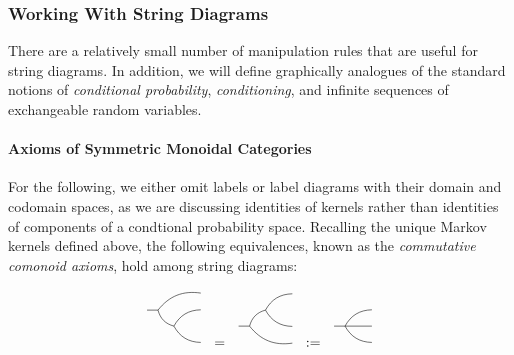 \subsubsection{Working With String Diagrams}\label{sssec:string_diagram_manipulation}


There are a relatively small number of manipulation rules that are useful for string diagrams. In addition, we will define graphically analogues of the standard notions of \emph{conditional probability}, \emph{conditioning}, and infinite sequences of exchangeable random variables.

\paragraph{Axioms of Symmetric Monoidal Categories}

For the following, we either omit labels or label diagrams with their domain and codomain spaces, as we are discussing identities of kernels rather than identities of components of a condtional probability space. Recalling the unique Markov kernels defined above, the following equivalences, known as the \emph{commutative comonoid axioms}, hold among string diagrams:

\begin{align}
	\begin{tikzpicture}[scale=0.8]
	\path (0,0) node (X) {} 
	++ (0.5,0) coordinate (copy0)
	+ (1.5,0.5) node (X1) {}
	++ (0.5,-0.5) coordinate (copy1)
	+(1,0.5) node (X2) {}
	+(1,-0.5) node (X3) {};
	\draw (X) -- (copy0) to [bend left] (X1) (copy0) to [bend right] (copy1) to [bend left] (X2) (copy1) to [bend right] (X3);
	\end{tikzpicture}
	=
	\begin{tikzpicture}[scale=0.8]
	\path (0,0) node (X) {} 
	++ (0.5,0) coordinate (copy0)
	+ (1.5,-0.5) node (X1) {}
	++ (0.5,0.5) coordinate (copy1)
	+(1,0.5) node (X2) {}
	+(1,-0.5) node (X3) {};
	\draw (X) -- (copy0) to [bend right] (X1) (copy0) to [bend left] (copy1) to [bend left] (X2) (copy1) to [bend right] (X3);
	\end{tikzpicture}
	:=
	\begin{tikzpicture}[scale=0.8]
	\path (0,0) node (X) {} 
	++ (0.5,0) coordinate (copy0)
	+ (1,0.5) node (X1) {}
	+(1,0) node (X2) {}
	+(1,-0.5) node (X3) {};
	\draw (X) -- (copy0) to [bend left] (X1) (copy0) to (X2) (copy0) to [bend right] (X3);
	\end{tikzpicture}\label{eq:ccom1}
\end{align}


